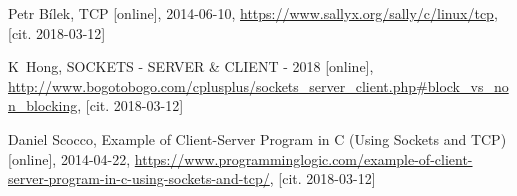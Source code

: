 \documentclass[11pt, a4paper, titlepage]{article}
\begin{document}

\newpage
\renewcommand{\refname}{Zdroje}
\begin{thebibliography}{9}

	Petr Bílek,
	TCP [online],
	2014-06-10,
	\url{https://www.sallyx.org/sally/c/linux/tcp},
	[cit. 2018-03-12]

	K~Hong,
	SOCKETS - SERVER \& CLIENT - 2018 [online],
	\url{http://www.bogotobogo.com/cplusplus/sockets_server_client.php#block_vs_non_blocking},
	[cit. 2018-03-12]

	Daniel Scocco,
	Example of Client-Server Program in C (Using Sockets and TCP) [online],
	2014-04-22,
	\url{https://www.programminglogic.com/example-of-client-server-program-in-c-using-sockets-and-tcp/},
	[cit. 2018-03-12]

\end{thebibliography}

\end{document}

